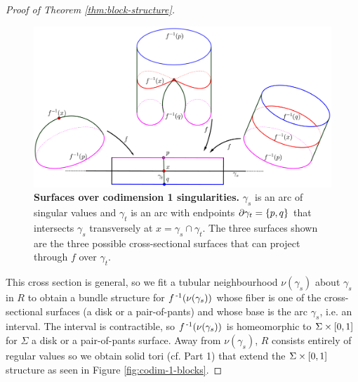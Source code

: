 \begin{proof}[Proof of Theorem \ref{thm:block-structure}]
	\begin{figure}[h]
		\centering
		\includegraphics[width=\textwidth]{figures/codim-1-surfaces.png}
		\caption{
			\textbf{Surfaces over codimension 1 singularities.}
			$\gamma_s$ is an arc of singular values and $\gamma_t$ is an arc with endpoints $\partial\gamma_t = \{p,q\}$ that intersects $\gamma_s$ transversely at $x=\gamma_s\cap\gamma_t$.
			The three surfaces shown are the three possible cross-sectional surfaces that can project through $f$ over $\gamma_t$.
		}
		\label{fig:codim-1-surfaces}
	\end{figure}
	
	This cross section is general, so we fit a tubular neighbourhood $\nu(\gamma_s)$ about $\gamma_s$ in $R$ to obtain a bundle structure for $f^{\,\text{-}1}(\nu(\gamma_s))$ whose fiber is one of the cross-sectional surfaces (a disk or a pair-of-pants) and whose base is the arc $\gamma_s$, i.e. an interval.
	The interval is contractible, so $f^{\,\text{-}1}(\nu(\gamma_s))$ is homeomorphic to $\Sigma\times[0,1]$ for $\Sigma$ a disk or a pair-of-pants surface.
	Away from $\nu(\gamma_s)$, $R$ consists entirely of regular values so we obtain solid tori (cf. Part 1) that extend the $\Sigma\times[0,1]$ structure as seen in Figure \ref{fig:codim-1-blocks}.
		

\end{proof}
